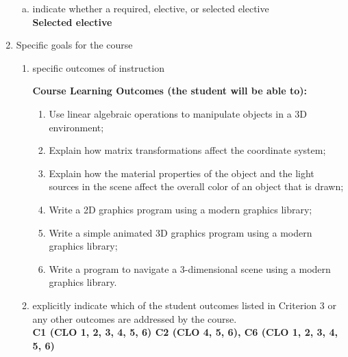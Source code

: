 \begin{enumerate}[1.]
\begin{enumerate}[a.]
\item indicate whether a required, elective, or selected elective\\ %
  {\bfseries
    Selected elective
  }

\end{enumerate}

\item Specific goals for the course
\begin{enumerate}
\item specific outcomes of instruction\\ %
  {\bfseries
    Course Learning Outcomes (the student will be able to):
\begin{enumerate}
\item Use linear algebraic operations to manipulate objects in a 3D environment;
\item Explain how matrix transformations affect the coordinate system;          
\item  Explain how the material properties of the object and the light
  sources in the scene affect the overall color of an object that is drawn;
\item Write a 2D graphics program using a modern graphics library;
\item Write a simple animated 3D graphics program using a modern graphics library;
\item Write a program to navigate a 3-dimensional scene using a modern graphics library.
\end{enumerate}
  }

\item explicitly indicate which of the student outcomes listed in Criterion 3 or any other outcomes are addressed by the course.\\
  {\bfseries
    C1 (CLO 1, 2, 3, 4, 5, 6)
    C2 (CLO 4, 5, 6),
    C6 (CLO 1, 2, 3, 4, 5, 6)
  }
\end{enumerate}


\end{enumerate}
